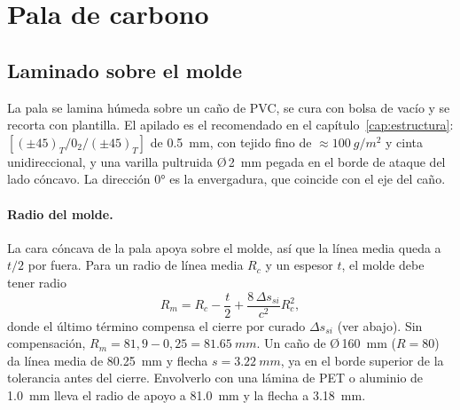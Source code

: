 \section{Pala de carbono}\label{sec:fabricacion-pala}

\subsection{Laminado sobre el molde}

La pala se lamina húmeda sobre un caño de PVC, se cura con bolsa de vacío y se recorta
con plantilla. El apilado es el recomendado en el capítulo~\ref{cap:estructura}:
$[(\pm45)_T/0_2/(\pm45)_T]$ de \SI{0.5}{mm}, con tejido fino de
$\approx\SI{100}{g/m^2}$ y cinta unidireccional, y una varilla pultruida Ø\,\SI{2}{mm}
pegada en el borde de ataque del lado cóncavo. La dirección \ang{0} es la envergadura,
que coincide con el eje del caño.

\paragraph{Radio del molde.} La cara cóncava de la pala apoya sobre el molde, así que la
línea media queda a $t/2$ por fuera. Para un radio de línea media $R_c$ y un espesor $t$,
el molde debe tener radio
\begin{equation}
  R_m = R_c - \frac{t}{2} + \frac{8\,\Delta s_{si}}{c^2}R_c^2 ,
  \label{eq:fabricacion-molde}
\end{equation}
donde el último término compensa el cierre por curado $\Delta s_{si}$ (ver abajo). Sin
compensación, $R_m=81{,}9-0{,}25=\SI{81.65}{mm}$. Un caño de Ø\,\SI{160}{mm} ($R=80$) da
línea media de \SI{80.25}{mm} y flecha $s=\SI{3.22}{mm}$, ya en el borde superior de la
tolerancia antes del cierre. Envolverlo con una lámina de PET o aluminio de
\SI{1.0}{mm} lleva el radio de apoyo a \SI{81.0}{mm} y la flecha a \SI{3.18}{mm}.

